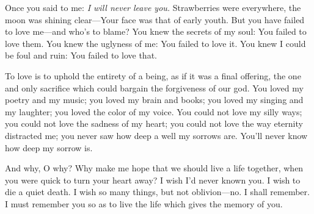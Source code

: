 \documentclass[a4paper, 12pt]{article}
\begin{document}
Once you said to me: \textit{I will never leave you.} Strawberries were everywhere,
the moon was shining clear---Your face was that of early youth. But you have failed to 
love me---and who's to blame? You knew the secrets of my soul: You failed to love them.
You knew the uglyness of me: You failed to love it. You knew I could be foul and ruin:
You failed to love that.

To love is to uphold the entirety of a being, as if it was a final offering,
the one and only sacrifice which could bargain the forgiveness of our god.
You loved my poetry and my music;
you loved my brain and books; you loved my singing and my laughter; you loved
the color of my voice. You could not love my silly ways; you could not love the
sadness of my heart; you could not love the way eternity distracted me; you never
saw how deep a well my sorrows are. You'll never know how deep my sorrow is.

And why, O why? Why make me hope that we should live a life together, when you
were quick to turn your heart away? I wish I'd never known you. I wish to die 
a quiet death. I wish so many things, but not oblivion---no. I shall remember.
I must remember you so as to live the life which gives the memory of you. 
\end{document}
